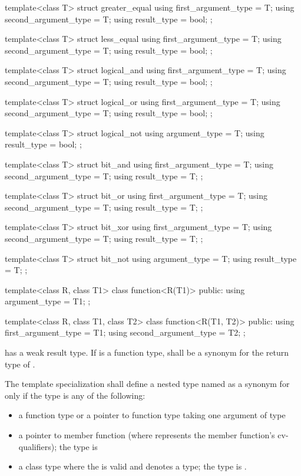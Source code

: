 \begin{codeblock}
{  template<class T> struct greater_equal {
    using first_argument_type  = T;
    using second_argument_type = T;
    using result_type          = bool;
  };

  template<class T> struct less_equal {
    using first_argument_type  = T;
    using second_argument_type = T;
    using result_type          = bool;
  };

  template<class T> struct logical_and {
    using first_argument_type  = T;
    using second_argument_type = T;
    using result_type          = bool;
  };

  template<class T> struct logical_or {
    using first_argument_type  = T;
    using second_argument_type = T;
    using result_type          = bool;
  };

  template<class T> struct logical_not {
    using argument_type = T;
    using result_type   = bool;
  };

  template<class T> struct bit_and {
    using first_argument_type  = T;
    using second_argument_type = T;
    using result_type          = T;
  };

  template<class T> struct bit_or {
    using first_argument_type  = T;
    using second_argument_type = T;
    using result_type          = T;
  };

  template<class T> struct bit_xor {
    using first_argument_type  = T;
    using second_argument_type = T;
    using result_type          = T;
  };

  template<class T> struct bit_not {
    using argument_type = T;
    using result_type   = T;
  };

  template<class R, class T1> class function<R(T1)> {
  public:
    using argument_type = T1;
  };

  template<class R, class T1, class T2> class function<R(T1, T2)> {
  public:
    using first_argument_type  = T1;
    using second_argument_type = T2;
  };
}
\end{codeblock}

%
\pnum
{} has a weak result type.
If  is a function type,
 shall be a synonym for the return type of .

%
\pnum
The template specialization 
shall define a nested type named 
as a synonym for 
only if the type  is any of the following:
\begin{itemize}
\item a function type or a pointer to function type taking one argument of type 
\item a pointer to member function  \cv{} (where \cv{} represents the member function's cv-qualifiers); the type  is \cv{}~
\item a class type where the  
is valid and denotes a type;
the type  is .
\end{itemize}

